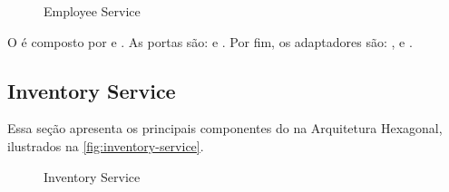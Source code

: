 \begin{figure}[H]
    \centering
    \caption{Employee Service}
    \label{fig:employee-service}
\end{figure}

O  é composto por  e . As portas são:  e . Por fim, os adaptadores são: ,  e .

\subsection{Inventory Service}
Essa seção apresenta os principais componentes do  na Arquitetura Hexagonal, ilustrados na \autoref{fig:inventory-service}.

\begin{figure}[H]
    \centering
    \caption{Inventory Service}
    \label{fig:inventory-service}
\end{figure}

